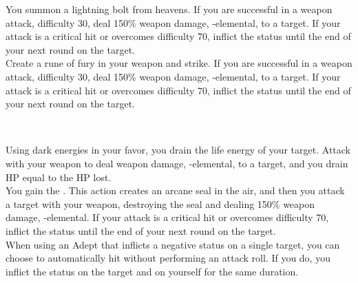 \begin{tabjob}
         You summon a lightning bolt from heavens. If you are successful in a weapon attack, difficulty 30, deal 150\% weapon damage, -elemental, to a target. If your attack is a critical hit or overcomes difficulty 70, inflict the  status until the end of your next round on the target. \\

         Create a rune of fury in your weapon and strike. If you are successful in a weapon attack, difficulty 30, deal 150\% weapon damage, -elemental, to a target. If your attack is a critical hit or overcomes difficulty 70, inflict the  status until the end of your next round on the target. \\

    \tabjobsep%

    \\
    \tabjobspec{}

         Using dark energies in your favor, you drain the life energy of your target. Attack with your weapon to deal weapon damage, -elemental, to a target, and you drain HP equal to the HP lost\@. \\

         You gain the  . This action creates an arcane seal in the air, and then you attack a target with your weapon, destroying the seal and dealing 150\% weapon damage, -elemental. If your attack is a critical hit or overcomes difficulty 70, inflict the  status until the end of your next round on the target. \\

         When using an Adept  that inflicts a negative status on a single target, you can choose to automatically hit without performing an attack roll. If you do, you inflict the status on the target and on yourself for the same duration. \\


\end{tabjob}
